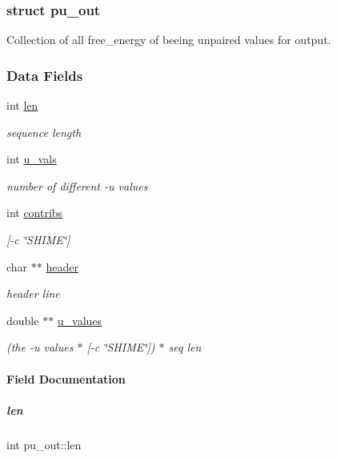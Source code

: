 \subsubsection{struct pu\+\_\+out}
Collection of all free\+\_\+energy of beeing unpaired values for output. \subsubsection*{Data Fields}
\begin{DoxyCompactItemize}
\item 
int \mbox{\hyperlink{group__data__structures_a314b8f43c3ee0bf6060afbeced5dbe6c}{len}}
\begin{DoxyCompactList}\small\item\em sequence length \end{DoxyCompactList}\item 
int \mbox{\hyperlink{group__data__structures_a7697bc7a46cd1b8e37e337e708cb6023}{u\+\_\+vals}}
\begin{DoxyCompactList}\small\item\em number of different -\/u values \end{DoxyCompactList}\item 
int \mbox{\hyperlink{group__data__structures_a638b0de1837cfd441871d005d3ab2938}{contribs}}
\begin{DoxyCompactList}\small\item\em \mbox{[}-\/c \char`\"{}\+S\+H\+I\+M\+E\char`\"{}\mbox{]} \end{DoxyCompactList}\item 
char $\ast$$\ast$ \mbox{\hyperlink{group__data__structures_ac9e9e30b16e7d04c770460b8487fb09d}{header}}
\begin{DoxyCompactList}\small\item\em header line \end{DoxyCompactList}\item 
double $\ast$$\ast$ \mbox{\hyperlink{group__data__structures_a366edbc4170d5c177908e178ff340828}{u\+\_\+values}}
\begin{DoxyCompactList}\small\item\em (the -\/u values $\ast$ \mbox{[}-\/c \char`\"{}\+S\+H\+I\+M\+E\char`\"{}\mbox{]}) $\ast$ seq len \end{DoxyCompactList}\end{DoxyCompactItemize}


\paragraph{Field Documentation}
\mbox{\label{group__data__structures_a314b8f43c3ee0bf6060afbeced5dbe6c}} 
\subparagraph{\texorpdfstring{len}{len}}
{\footnotesize\ttfamily int pu\+\_\+out\+::len}



